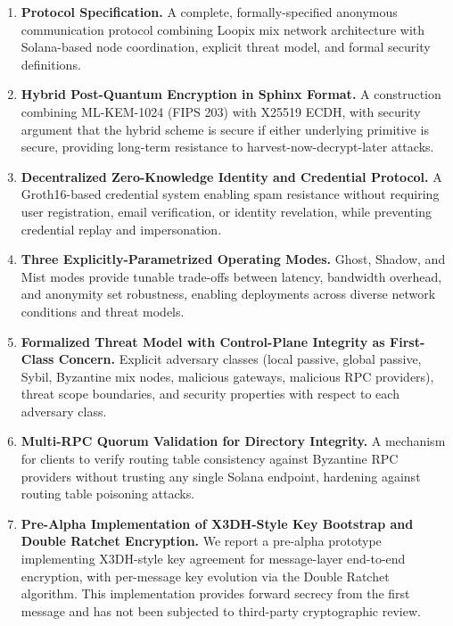\documentclass[11pt]{article}
\theoremstyle{definition}
\theoremstyle{remark}
\begin{document}
\begin{enumerate}
    \item \textbf{Protocol Specification.} A complete, formally-specified anonymous communication protocol combining Loopix mix network architecture with Solana-based node coordination, explicit threat model, and formal security definitions.

    \item \textbf{Hybrid Post-Quantum Encryption in Sphinx Format.} A construction combining ML-KEM-1024 (FIPS 203) with X25519 ECDH, with security argument that the hybrid scheme is secure if either underlying primitive is secure, providing long-term resistance to harvest-now-decrypt-later attacks.

    \item \textbf{Decentralized Zero-Knowledge Identity and Credential Protocol.} A Groth16-based credential system enabling spam resistance without requiring user registration, email verification, or identity revelation, while preventing credential replay and impersonation.

    \item \textbf{Three Explicitly-Parametrized Operating Modes.} Ghost, Shadow, and Mist modes provide tunable trade-offs between latency, bandwidth overhead, and anonymity set robustness, enabling deployments across diverse network conditions and threat models.

    \item \textbf{Formalized Threat Model with Control-Plane Integrity as First-Class Concern.} Explicit adversary classes (local passive, global passive, Sybil, Byzantine mix nodes, malicious gateways, malicious RPC providers), threat scope boundaries, and security properties with respect to each adversary class.

    \item \textbf{Multi-RPC Quorum Validation for Directory Integrity.} A mechanism for clients to verify routing table consistency against Byzantine RPC providers without trusting any single Solana endpoint, hardening against routing table poisoning attacks.

    \item \textbf{Pre-Alpha Implementation of X3DH-Style Key Bootstrap and Double Ratchet Encryption.} We report a pre-alpha prototype implementing X3DH-style key agreement for message-layer end-to-end encryption, with per-message key evolution via the Double Ratchet algorithm. This implementation provides forward secrecy from the first message and has not been subjected to third-party cryptographic review.
\end{enumerate}
\end{document}
